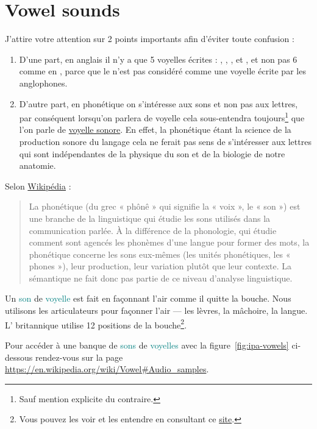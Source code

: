 \part{Vowel sounds}\label{part:vow}


J'attire votre attention sur 2 points importants afin d'éviter toute
confusion :
\begin{enumerate}
\item D'une part, en anglais il n'y a que 5 voyelles écrites :
  , , ,  et , et non pas 6
  comme en , parce que le  n'est pas  considéré
  comme une voyelle écrite par les anglophones.
\item D'autre part, en phonétique on s'intéresse aux sons et non pas aux
  lettres, par conséquent lorsqu'on parlera de voyelle cela
  sous-entendra toujours\footnote{Sauf mention explicite du
    contraire.} que l'on parle de \underline{voyelle sonore}. En
  effet, la phonétique étant la science de la production sonore du
  langage cela ne ferait pas sens de s'intéresser aux lettres qui sont
  indépendantes de la physique du son et de la biologie de notre anatomie.
\end{enumerate}
Selon \href{https://fr.wikipedia.org/wiki/Phon\%C3\%A9tique}{Wikipédia} :
\begin{quote}
  La phonétique (du grec « phônê » qui signifie la « voix », le « son ») est une branche de la linguistique qui étudie les sons utilisés dans la communication parlée. À la différence de la phonologie, qui étudie comment sont agencés les phonèmes d'une langue pour former des mots, la phonétique concerne les sons eux-mêmes (les unités phonétiques, les « phones »), leur production, leur variation plutôt que leur contexte. La sémantique ne fait donc pas partie de ce niveau d'analyse linguistique.
\end{quote}

Un \textcolor{teal}{son} de \textcolor{teal}{voyelle}
est fait en façonnant l'air comme il quitte la
bouche. Nous utilisons les articulateurs pour façonner l'air --- les
lèvres, la mâchoire, la langue. L' britannique utilise
12 positions de la bouche\footnote{Vous pouvez les voir et les
  entendre en consultant ce \href{https://pronunciationstudio.com/vowel02/}{site}.}.  

Pour accéder à une banque de \textcolor{teal}{sons} de
\textcolor{teal}{voyelles} avec la figure~\ref{fig:ipa-vowels} ci-dessous rendez-vous sur
la page \url{https://en.wikipedia.org/wiki/Vowel\#Audio_samples}.

